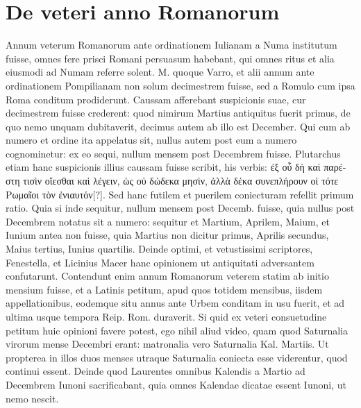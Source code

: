 \section{De veteri anno Romanorum}
%
Annum veterum Romanorum ante ordinationem Iulianam a
Numa institutum fuisse, omnes fere prisci Romani persuasum
habebant, qui omnes ritus et alia eiusmodi ad Numam referre
solent.
M. quoque Varro, et alii annum ante ordinationem Pompilianam
non solum decimestrem fuisse, sed a Romulo cum ipsa Roma
conditum prodiderunt.
Caussam afferebant suspicionis suae, cur
decimestrem fuisse crederent: quod nimirum Martius antiquitus fuerit
primus, de quo nemo unquam dubitaverit, decimus autem ab illo
est December.
Qui cum ab %
 numero et ordine ita appelatus sit, nullus
autem post eum a numero cognominetur: ex eo sequi, nullum mensem
post Decembrem fuisse.
Plutarchus etiam hanc suspicionis illius
caussam fuisse scribit, his verbis:
 \textgreek{ἐξ οὖ δὴ καὶ παρέστη τισὶν οἴεσθαι καὶ λέγειν,
ὡς οὐ δώδεκα μησὶν, ἀλλὰ δέκα συνεπλήρουν οἱ τότε Ρωμαῖοι τὸν ἐνιαυτόν[?]}.
Sed hanc futilem et puerilem coniecturam refellit primum
ratio.
Quia si inde sequitur, nullum mensem post Decemb. fuisse, %
quia nullus post Decembrem notatus sit a numero: sequitur et
Martium, Aprilem, Maium, et Iunium antea non fuisse, quia Martius
non dicitur primus, Aprilis secundus, Maius tertius, Iunius
quartilis.
%
Deinde optimi, et vetustissimi scriptores,
 Fenestella, et Licinius
Macer hanc opinionem ut antiquitati adversantem confutarunt.
Contendunt enim annum Romanorum veterem statim ab initio
 mensium fuisse, et a Latinis petitum, apud quos totidem
mensibus, iisdem appellationibus, eodemque situ annus ante Urbem
conditam in usu fuerit, et ad ultima usque tempora Reip. Rom. %
duraverit.
Si quid ex veteri consuetudine petitum huic opinioni favere
potest, ego nihil aliud video, quam quod Saturnalia virorum
mense Decembri erant: matronalia vero Saturnalia Kal. Martiis. %
Ut
propterea in illos duos menses utraque Saturnalia coniecta esse viderentur,
quod continui essent.
Deinde quod Laurentes omnibus
Kalendis a Martio ad Decembrem Iunoni sacrificabant, quia omnes
Kalendae dicatae essent Iunoni, ut nemo nescit.
